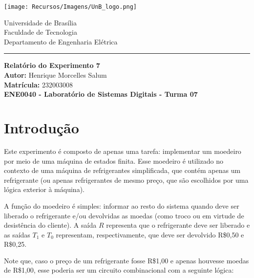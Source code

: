 \documentclass[a4paper,12pt]{article}
\newcommand{\capa}{
    \begin{titlepage}
        \begin{multicols}{2}
            \begin{flushleft}
                \texttt{[image: Recursos/Imagens/UnB\_logo.png]}
            \end{flushleft}
            \columnbreak
            \begin{flushright}
                Universidade de Brasília \\
                Faculdade de Tecnologia \\
                Departamento de Engenharia Elétrica
            \end{flushright}
        \end{multicols}
        \begin{center}
        \vspace{-20pt}
        \rule{\textwidth}{0.4pt}
        \end{center}
        \vspace{0.6cm}
        \begin{center}
            {\Huge \textbf{Relatório do Experimento 7}} \\[1em]
            {\large \textbf{Autor:} Henrique Morcelles Salum} \\[0.5em]
            {\large \textbf{Matrícula:} 232003008} \\
            \vfill
            {\large \textbf{ENE0040 - Laboratório de Sistemas Digitais - Turma 07}} \\
        \end{center}
    \end{titlepage}
}
\begin{document}
\capa

\newpage
\tableofcontents
\newpage

\section{Introdução}

Este experimento é composto de apenas uma tarefa: implementar um moedeiro por meio de uma máquina de estados finita. Esse moedeiro é utilizado no contexto de uma máquina de refrigerantes simplificada, que contém apenas um refrigerante (ou apenas refrigerantes de mesmo preço, que são escolhidos por uma lógica exterior à máquina).

A função do moedeiro é simples: informar ao resto do sistema quando deve ser liberado o refrigerante e/ou devolvidas as moedas (como troco ou em virtude de desistência do cliente). A saída $R$ representa que o refrigerante deve ser liberado e as saídas $T_1$ e $T_0$ representam, respectivamente, que deve ser devolvido R\$0,50 e R\$0,25.

Note que, caso o preço de um refrigerante fosse R\$1,00 e apenas houvesse moedas de R\$1,00, esse poderia ser um circuito combinacional com a seguinte lógica: 

\begin{figure}[H]
    \centering
    \vspace{-10pt}
\end{figure}
\end{document}
